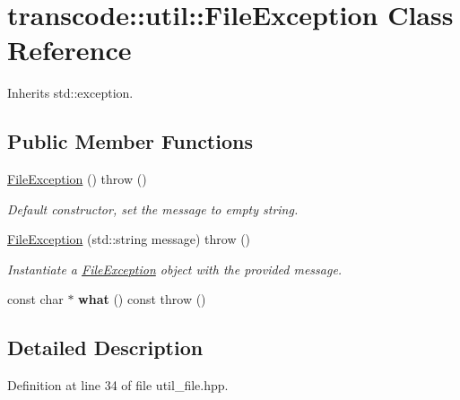 \hypertarget{classtranscode_1_1util_1_1FileException}{
\section{transcode::util::FileException Class Reference}
\label{classtranscode_1_1util_1_1FileException}
}


Inherits std::exception.

\subsection*{Public Member Functions}
\begin{DoxyCompactItemize}
\item 
\hyperlink{classtranscode_1_1util_1_1FileException_a5b20347ec159197cb226aecca43096d2}{FileException} ()  throw ()
\begin{DoxyCompactList}\small\item\em Default constructor, set the message to empty string. \item\end{DoxyCompactList}\item 
\hyperlink{classtranscode_1_1util_1_1FileException_a49d8ab6a50387dbe1a3e82f22c0f6450}{FileException} (std::string message)  throw ()
\begin{DoxyCompactList}\small\item\em Instantiate a \hyperlink{classtranscode_1_1util_1_1FileException}{FileException} object with the provided message. \item\end{DoxyCompactList}\item 
\hypertarget{classtranscode_1_1util_1_1FileException_aebbce570a698c3909fdd614bea311f49}{
const char $\ast$ {\bfseries what} () const   throw ()}
\label{classtranscode_1_1util_1_1FileException_aebbce570a698c3909fdd614bea311f49}

\end{DoxyCompactItemize}


\subsection{Detailed Description}


Definition at line 34 of file util\_\-file.hpp.



